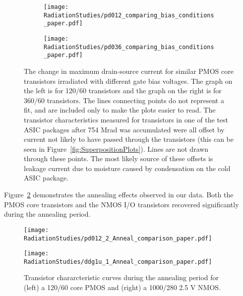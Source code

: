 \begin{figure}[htb!]
	\begin{subfigure}{.5\linewidth}
	\centering
	\texttt{[image: RadiationStudies/pd012\_comparing\_bias\_conditions\_paper.pdf]}
	\end{subfigure}
\hspace{0.5cm}
	\begin{subfigure}{.5\linewidth}
	\centering
	\texttt{[image: RadiationStudies/pd036\_comparing\_bias\_conditions\_paper.pdf]}
	\end{subfigure}
\caption{The change in maximum drain-source current for similar PMOS core transistors irradiated with different gate bias voltages. The graph on the left is for 120/60 transistors and the graph on the right is for 360/60 transistors.  The lines connecting points do not represent a fit, and are included only to make the plots easier to read.  The transistor characteristics measured for transistors in one of the test ASIC packages after 754 Mrad was accumulated were all offset by current not likely to have passed through the transistors (this can be seen in Figure~\ref{fig:SuperpositionPlots}).  Lines are not drawn through these points.  The most likely source of these offsets is leakage current due to moisture caused by condensation on the cold ASIC package.}
\label{fig:PMOSBiasConditions}
\end{figure}

Figure~\ref{fig:AnnealSuperpositionPlots} demonstrates the annealing effects observed in our data. Both the PMOS core transistors and the NMOS I/O transistors recovered significantly during the annealing period. 

\begin{figure}[htb!]
\begin{minipage}[b]{0.5\textwidth}
	\centering
	\texttt{[image: RadiationStudies/pd012\_2\_Anneal\_comparison\_paper.pdf]}
\end{minipage}
\hspace{0.5cm}
\begin{minipage}[b]{0.5\textwidth}
	\centering
	\texttt{[image: RadiationStudies/ddg1u\_1\_Anneal\_comparison\_paper.pdf]}
\end{minipage}
\caption{Transistor chararcteristic curves during the annealing period for (left) a 120/60 core PMOS and (right) a 1000/280 2.5 V NMOS.}
\label{fig:AnnealSuperpositionPlots}
\end{figure}

